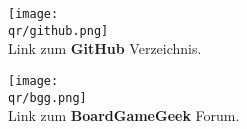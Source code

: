 \bigbreak

\begin{multicols}{2}
\centering
\texttt{[image: \\qr/github.png]}\\
Link zum \textbf{GitHub} Verzeichnis.

\columnbreak

\texttt{[image: \\qr/bgg.png]}\\
Link zum \textbf{BoardGameGeek} Forum.
\end{multicols}
